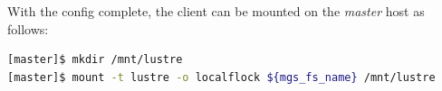 \documentclass[letterpaper]{article}
\begin{document}
With the \Lustre{} config complete, the client can be mounted on the {\em master}
host as follows:
\begin{lstlisting}[language=bash,keywords={},upquote=true]
[master]$ mkdir /mnt/lustre
[master]$ mount -t lustre -o localflock ${mgs_fs_name} /mnt/lustre
\end{lstlisting}


\end{document}
